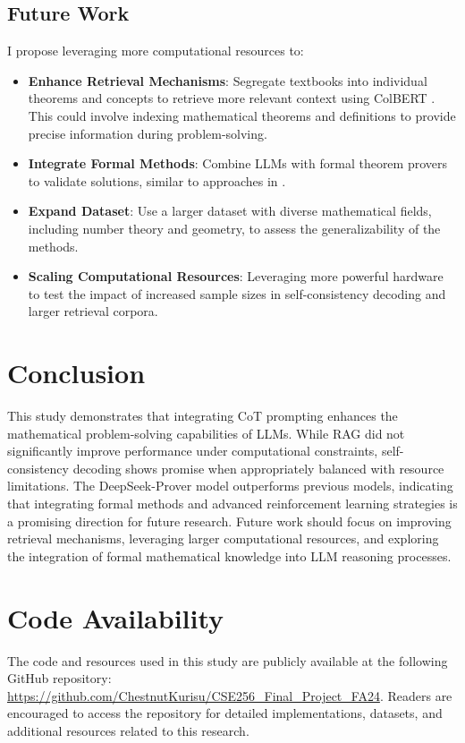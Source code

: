 \documentclass[11pt,a4paper]{article}
\begin{document}
\subsection{Future Work}
I propose leveraging more computational resources to:

\begin{itemize}[noitemsep,nolistsep]
    \item \textbf{Enhance Retrieval Mechanisms}: Segregate textbooks into individual theorems and concepts to retrieve more relevant context using ColBERT \cite{khattab2020colbert}. This could involve indexing mathematical theorems and definitions to provide precise information during problem-solving.
    \item \textbf{Integrate Formal Methods}: Combine LLMs with formal theorem provers to validate solutions, similar to approaches in \cite{gou2024toratoolintegratedreasoningagent}.
    \item \textbf{Expand Dataset}: Use a larger dataset with diverse mathematical fields, including number theory and geometry, to assess the generalizability of the methods.
    \item \textbf{Scaling Computational Resources}: Leveraging more powerful hardware to test the impact of increased sample sizes in self-consistency decoding and larger retrieval corpora.
\end{itemize}

\section{Conclusion}
This study demonstrates that integrating CoT prompting enhances the mathematical problem-solving capabilities of LLMs. While RAG did not significantly improve performance under computational constraints, self-consistency decoding shows promise when appropriately balanced with resource limitations. The DeepSeek-Prover model outperforms previous models, indicating that integrating formal methods and advanced reinforcement learning strategies is a promising direction for future research. Future work should focus on improving retrieval mechanisms, leveraging larger computational resources, and exploring the integration of formal mathematical knowledge into LLM reasoning processes.

\section{Code Availability}

The code and resources used in this study are publicly available at the following GitHub repository: \small{\url{https://github.com/ChestnutKurisu/CSE256_Final_Project_FA24}}\normalsize. Readers are encouraged to access the repository for detailed implementations, datasets, and additional resources related to this research.
\end{document}
